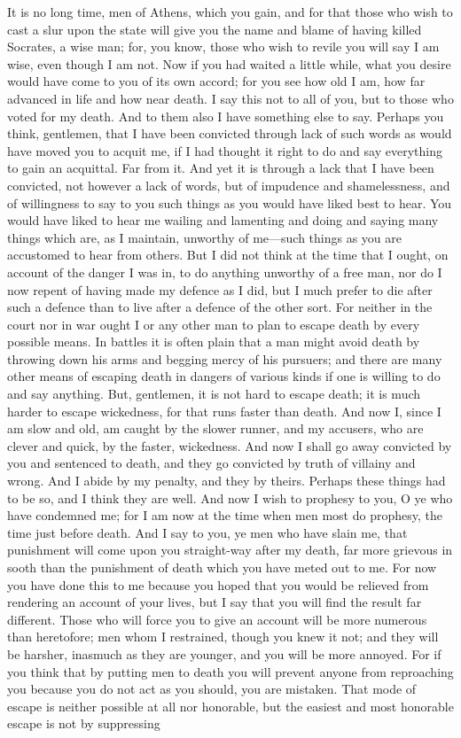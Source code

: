 \documentclass[letterpaper,12pt]{article}
\newcommand{\stephpag}[1]{\marginnote{\small\itshape\fontfamily{ppl}\selectfont #1}}
\begin{document}
It is no long time, men of Athens, which you gain, and for that those who wish to cast a slur upon the state will give you the name and blame of having killed Socrates, a wise man; for, you know, those who wish to revile you will say I am wise, even though I am not. Now if you had waited a little while, what you desire would have come to you of its own accord; for you see how old I am, how far advanced in life and how near death. I say this not to all of you, \stephpag{d} but to those who voted for my death. And to them also I have something else to say. Perhaps you think, gentlemen, that I have been convicted through lack of such words as would have moved you to acquit me, if I had thought it right to do and say everything to gain an acquittal. Far from it. And yet it is through a lack that I have been convicted, not however a lack of words, but of impudence and shamelessness, and of willingness to say to you such things as you would have liked best to hear. You would have liked to hear me wailing and lamenting and doing and saying \stephpag{e} many things which are, as I maintain, unworthy of me---such things as you are accustomed to hear from others. But I did not think at the time that I ought, on account of the danger I was in, to do anything unworthy of a free man, nor do I now repent of having made my defence as I did, but I much prefer to die after such a defence than to live after a defence of the other sort. For neither in the court nor in war ought I \stephpag{39 a} or any other man to plan to escape death by every possible means. In battles it is often plain that a man might avoid death by throwing down his arms and begging mercy of his pursuers; and there are many other means of escaping death in dangers of various kinds if one is willing to do and say anything. But, gentlemen, it is not hard to escape death; it is much harder to escape wickedness, for that runs faster than death. \stephpag{b} And now I, since I am slow and old, am caught by the slower runner, and my accusers, who are clever and quick, by the faster, wickedness. And now I shall go away convicted by you and sentenced to death, and they go convicted by truth of villainy and wrong. And I abide by my penalty, and they by theirs. Perhaps these things had to be so, and I think they are well. \stephpag{c} And now I wish to prophesy to you, O ye who have condemned me; for I am now at the time when men most do prophesy, the time just before death. And I say to you, ye men who have slain me, that punishment will come upon you straight-way after my death, far more grievous in sooth than the punishment of death which you have meted out to me. For now you have done this to me because you hoped that you would be relieved from rendering an account of your lives, but I say that you will find the result far different. Those who will force you to give an account will be more numerous than heretofore; \stephpag{d} men whom I restrained, though you knew it not; and they will be harsher, inasmuch as they are younger, and you will be more annoyed. For if you think that by putting men to death you will prevent anyone from reproaching you because you do not act as you should, you are mistaken. That mode of escape is neither possible at all nor honorable, but the easiest and most honorable escape is not by suppressing 
\end{document}
